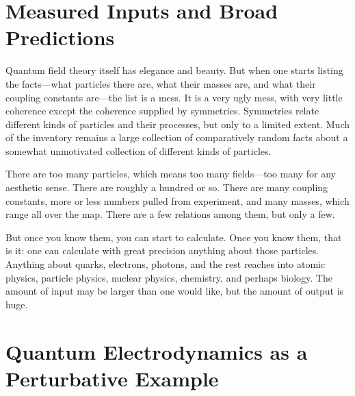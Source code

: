 \begin{classroomqa}
\end{classroomqa}

\section{Measured Inputs and Broad Predictions}

Quantum field theory itself has elegance and beauty. But when one starts listing the facts---what particles there are, what their masses are, and what their coupling constants are---the list is a mess. It is a very ugly mess, with very little coherence except the coherence supplied by symmetries. Symmetries relate different kinds of particles and their processes, but only to a limited extent. Much of the inventory remains a large collection of comparatively random facts about a somewhat unmotivated collection of different kinds of particles.

\begin{classroomqa}
\end{classroomqa}

There are too many particles, which means too many fields---too many for any aesthetic sense. There are roughly a hundred or so. There are many coupling constants, more or less numbers pulled from experiment, and many masses, which range all over the map. There are a few relations among them, but only a few.

But once you know them, you can start to calculate. Once you know them, that is it: one can calculate with great precision anything about those particles. Anything about quarks, electrons, photons, and the rest reaches into atomic physics, particle physics, nuclear physics, chemistry, and perhaps biology. The amount of input may be larger than one would like, but the amount of output is huge.

\section{Quantum Electrodynamics as a Perturbative Example}

